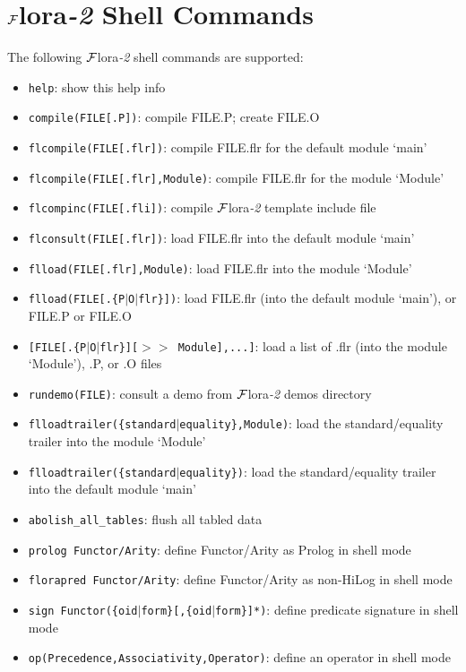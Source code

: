 \documentclass[11pt]{article}
\newcommand{\FLORA}{{\mbox{${\cal F}${\sc lora}\rm\emph{-2}}}\xspace}
\begin{document}
\section{\FLORA Shell Commands} \label{sec-shell-commands}

The following \FLORA shell commands are supported:
\begin{itemize}
\item {\tt help}:
    show this help info
\item {\tt compile(FILE[.P])}:
    compile FILE.P; create FILE.O
\item {\tt flcompile(FILE[.flr])}:
    compile FILE.flr for the default module `main'
\item {\tt flcompile(FILE[.flr],Module)}:
    compile FILE.flr for the module `Module'
\item {\tt flcompinc(FILE[.fli])}:
    compile \FLORA template include file
\item {\tt flconsult(FILE[.flr])}:
    load FILE.flr into the default module `main'
\item {\tt flload(FILE[.flr],Module)}:
    load FILE.flr into the module `Module'
\item {\tt flload(FILE[.\{P$|$O$|$flr\}])}:
    load FILE.flr (into the default module `main'), or FILE.P or FILE.O
\item {\tt [FILE[.\{P$|$O$|$flr\}][$>>$ Module],...]}:
    load a list of .flr (into the module `Module'), .P, or .O files
\item {\tt rundemo(FILE)}:
    consult a demo from \FLORA demos directory
\item {\tt flloadtrailer(\{standard$|$equality\},Module)}:
    load the standard/equality trailer into the module `Module'
\item {\tt flloadtrailer(\{standard$|$equality\})}:
    load the standard/equality trailer into the default module `main'
\item {\tt abolish\_all\_tables}:
    flush all tabled data
\item {\tt prolog Functor/Arity}:
    define Functor/Arity as Prolog in shell mode
\item {\tt florapred Functor/Arity}:
    define Functor/Arity as non-HiLog in shell mode
\item {\tt sign Functor(\{oid$|$form\}[,\{oid$|$form\}]*)}:
    define predicate signature in shell mode
\item {\tt op(Precedence,Associativity,Operator)}:
    define an operator in shell mode

\end{itemize}
\end{document}
